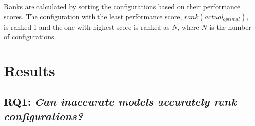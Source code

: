 \documentclass[sigconf]{acmart}
\DeclarePairedDelimiter\abs{\lvert}{\rvert}%
\begin{document}
\noindent Ranks are calculated by sorting the configurations based on their performance scores. The configuration with the least performance score, $\mathit{rank(actual_{optimal})}$, is ranked 1 and the one with highest  score is ranked as $N$, where $N$ is the number of configurations.


 




\section{Results}
\subsection{RQ1: \textit{Can  inaccurate    models accurately rank configurations?}}
\end{document}
